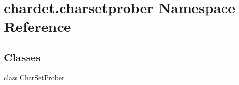 \hypertarget{namespacechardet_1_1charsetprober}{}\section{chardet.\+charsetprober Namespace Reference}
\label{namespacechardet_1_1charsetprober}
\subsection*{Classes}
\begin{DoxyCompactItemize}
\item 
class \hyperlink{classchardet_1_1charsetprober_1_1_char_set_prober}{Char\+Set\+Prober}
\end{DoxyCompactItemize}

